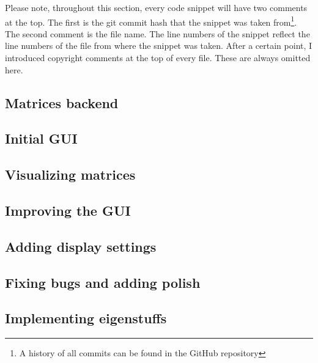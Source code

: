\documentclass[../main.tex]{subfiles}
\begin{document}
Please note, throughout this section, every code snippet will have two comments at the top. The first is the git commit hash that the snippet was taken from\footnote{A history of all commits can be found in the GitHub repository\cite{lintrans-github}}. The second comment is the file name. The line numbers of the snippet reflect the line numbers of the file from where the snippet was taken. After a certain point, I introduced copyright comments at the top of every file. These are always omitted here.

\subsection{Matrices backend\label{development:matrices-backend}}


\newpage

\subsection{Initial GUI\label{development:initial-gui}}


\newpage

\subsection{Visualizing matrices\label{development:visualizing-matrices}}


\newpage

\subsection{Improving the GUI\label{development:improving-the-gui}}


\newpage

\subsection{Adding display settings\label{development:adding-display-settings}}


\newpage

\subsection{Fixing bugs and adding polish\label{development:fixing-bugs-and-adding-polish}}


\newpage

\subsection{Implementing eigenstuffs\label{development:implementing-eigenstuffs}}

\end{document}
